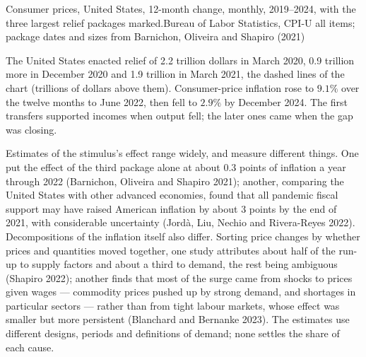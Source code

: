 \begin{omchart}{Consumer prices, United States, 12-month change, monthly,
2019--2024, with the three largest relief packages marked.}{Bureau of
Labor Statistics, CPI-U all items; package dates and sizes from Barnichon,
Oliveira and Shapiro (2021)}
\end{omchart}

\begin{record}[2020--23]
The United States enacted relief of 2.2 trillion dollars in March 2020, 0.9
trillion more in December 2020 and 1.9 trillion in March 2021, the
dashed lines of the chart (trillions of dollars above them).
Consumer-price inflation rose to $9.1\%$ over the twelve months to June
2022, then fell to $2.9\%$ by December 2024. %
The first transfers supported incomes when output fell; the later ones came
when the gap was closing.
\end{record}

\begin{debate}
Estimates of the stimulus's effect range widely, and measure different
things. One put the
effect of the third package alone at about $0.3$ points of inflation a year
through 2022 (Barnichon, Oliveira and Shapiro 2021); %
another, comparing the United States with other advanced economies, found
that all pandemic fiscal support may have raised American inflation by
about 3 points by the end of 2021, with considerable uncertainty (Jordà,
Liu, Nechio and Rivera-Reyes 2022). %
Decompositions of the inflation itself also differ. Sorting price changes
by whether prices and quantities moved together, one study attributes
about half of the run-up to supply factors and about a third to demand,
the rest being ambiguous (Shapiro 2022); %
another finds that most of the surge came from shocks to prices given
wages --- commodity prices pushed up by strong demand, and shortages in
particular sectors --- rather than from tight labour markets, whose effect
was smaller but more persistent (Blanchard and Bernanke 2023). %
The estimates use different designs, periods and definitions of demand;
none settles the share of each cause.
\end{debate}

